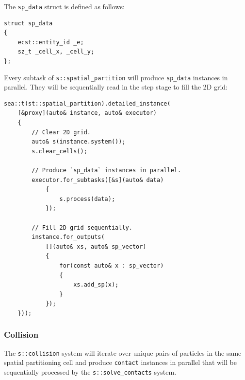 \documentclass[twoside, 12pt, a4paper, openright]{book}
\begin{document}
The
\texttt{sp_data}
struct is defined as follows:

\begin{verbatim}
struct sp_data
{
    ecst::entity_id _e;
    sz_t _cell_x, _cell_y;
};
\end{verbatim}

Every subtask of
\texttt{s::spatial_partition}
will produce
\texttt{sp_data}
instances in parallel. They will be sequentially read in the step stage
to fill the 2D grid:

\begin{verbatim}
sea::t(st::spatial_partition).detailed_instance(
    [&proxy](auto& instance, auto& executor)
    {
        // Clear 2D grid.
        auto& s(instance.system());
        s.clear_cells();

        // Produce `sp_data` instances in parallel.
        executor.for_subtasks([&s](auto& data)
            {
                s.process(data);
            });

        // Fill 2D grid sequentially.
        instance.for_outputs(
            [](auto& xs, auto& sp_vector)
            {
                for(const auto& x : sp_vector)
                {
                    xs.add_sp(x);
                }
            });
    }));
\end{verbatim}

\subsubsection{Collision}\label{collision}

The
\texttt{s::collision}
system will iterate over unique pairs of particles in the same spatial
partitioning cell and produce
\texttt{contact}
instances in parallel that will be sequentially processed by the
\texttt{s::solve_contacts}
system.
\end{document}
